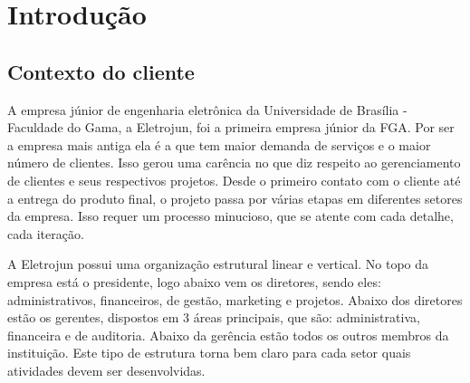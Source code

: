 \chapter[Introdução]{Introdução}
  \section{Contexto do cliente}
A empresa júnior de engenharia eletrônica da Universidade de Brasília - Faculdade do Gama, a Eletrojun, foi a primeira empresa júnior da FGA. Por ser a empresa mais antiga ela é a que tem maior demanda de serviços e o maior número de clientes. Isso gerou uma carência no que diz respeito ao gerenciamento de clientes e seus respectivos projetos. Desde o primeiro contato com o cliente até a entrega do produto final, o projeto passa por várias etapas em diferentes setores da empresa. Isso requer um processo minucioso, que se atente com cada detalhe, cada iteração.

A Eletrojun possui uma organização estrutural linear e vertical. No topo da empresa está o presidente, logo abaixo vem os diretores, sendo eles: administrativos, financeiros, de gestão, marketing e projetos. Abaixo dos diretores estão os gerentes, dispostos em 3 áreas principais, que são: administrativa, financeira e de auditoria. Abaixo da gerência estão todos os outros membros da instituição. Este tipo de estrutura torna bem claro para cada setor quais atividades devem ser desenvolvidas.